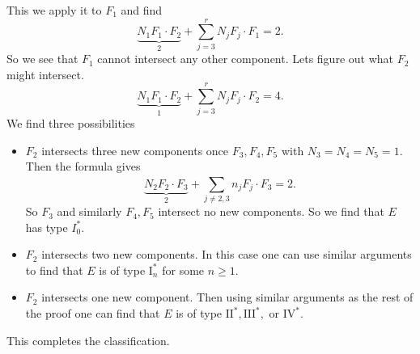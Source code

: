 This we apply it to $F_1$ and find \[
	\underbrace{N_1 F_1 \cdot  F_2}_{2} + \sum_{j = 3}^{r} N_j F_j\cdot F_1 = 2
.\] 
So we see that $F_1$ cannot intersect any other component. 
Lets figure out what $F_2$ might intersect. 
\[
	\underbrace{N_1 F_1 \cdot F_2}_1 + \sum_{j = 3}^{r} N_j F_j \cdot F_2 = 4
.\] 
We find three possibilities
\begin{itemize}
	\item $F_2$ intersects three new components once $F_3, F_4, F_5$ with $N_3 = N_4 = N_5 = 1$. 
		Then the formula gives \[
			\underbrace{N_2F_2 \cdot  F_3}_{2} + \sum_{j \ne 2,3}^{}n_j F_j \cdot  F_3 = 2 
		.\] 
		So $F_3$ and similarly $F_4, F_5$ intersect no new components. 
		So we find that $E$ has type $I_0^*$.
	\item  $F_2$ intersects two new components. 
		In this case one can use similar arguments to find that $E$ is of type $\mathrm I_n^*$ for some $n \ge 1$. 
	\item $F_2$ intersects one new component. 
		Then using similar arguments as the rest of the proof one can find that $E$ is of type $\mathrm{II}^*, \mathrm{III}^*,$ or $\mathrm{IV}^*$.
\end{itemize}
This completes the classification. 


